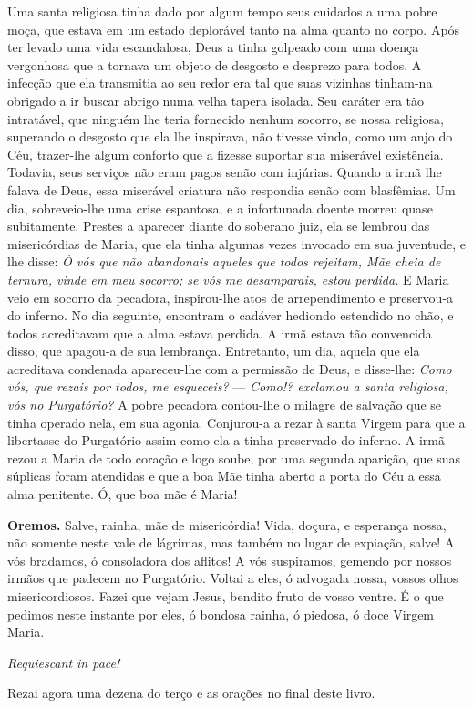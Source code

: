 Uma santa religiosa tinha dado por algum tempo seus cuidados a uma pobre moça, que estava em um estado deplorável tanto na alma quanto no corpo. Após ter levado uma vida escandalosa, Deus a tinha golpeado com uma doença vergonhosa que a tornava um objeto de desgosto e desprezo para todos. A infecção que ela transmitia ao seu redor era tal que suas vizinhas tinham-na obrigado a ir buscar abrigo numa velha tapera isolada. Seu caráter era tão intratável, que ninguém lhe teria fornecido nenhum socorro, se nossa religiosa, superando o desgosto que ela lhe inspirava, não tivesse vindo, como um anjo do Céu, trazer-lhe algum conforto que a fizesse suportar sua miserável existência. Todavia, seus serviços não eram pagos senão com injúrias. Quando a irmã lhe falava de Deus, essa miserável criatura não respondia senão com blasfêmias. Um dia, sobreveio-lhe uma crise espantosa, e a infortunada doente morreu quase subitamente. Prestes a aparecer diante do soberano juiz, ela se lembrou das misericórdias de Maria, que ela tinha algumas vezes invocado em sua juventude, e lhe disse: \textit{Ó vós que não abandonais aqueles que todos rejeitam, Mãe cheia de ternura, vinde em meu socorro; se vós me desamparais, estou perdida.} E Maria veio em socorro da pecadora, inspirou-lhe atos de arrependimento e preservou-a do inferno. No dia seguinte, encontram o cadáver hediondo estendido no chão, e todos acreditavam que a alma estava perdida. A irmã estava tão convencida disso, que apagou-a de sua lembrança. Entretanto, um dia, aquela que ela acreditava condenada apareceu-lhe com a permissão de Deus, e disse-lhe: \textit{Como vós, que rezais por todos, me esqueceis?} --- \textit{Como!? exclamou a santa religiosa, vós no Purgatório?} A pobre pecadora contou-lhe o milagre de salvação que se tinha operado nela, em sua agonia. Conjurou-a a rezar à santa Virgem para que a libertasse do Purgatório assim como ela a tinha preservado do inferno. A irmã rezou a Maria de todo coração e logo soube, por uma segunda aparição, que suas súplicas foram atendidas e que a boa Mãe tinha aberto a porta do Céu a essa alma penitente. Ó, que boa mãe é Maria!


\vspace{\baselineskip}\noindent \textbf{Oremos.} Salve, rainha, mãe de misericórdia! Vida, doçura, e esperança nossa, não somente neste vale de lágrimas, mas também no lugar de expiação, salve! A vós bradamos, ó consoladora dos aflitos! A vós suspiramos, gemendo por nossos irmãos que padecem no Purgatório. Voltai a eles, ó advogada nossa, vossos olhos misericordiosos. Fazei que vejam Jesus, bendito fruto de vosso ventre. É o que pedimos neste instante por eles, ó bondosa rainha, ó piedosa, ó doce Virgem Maria.



\begin{center}
\textit{Requiescant in pace!}
\end{center}

Rezai agora uma dezena do terço e as orações no final deste livro.
